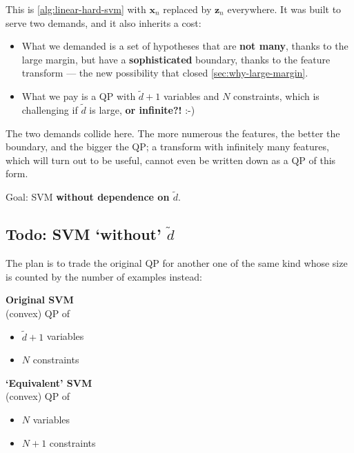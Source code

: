 This is \autoref{alg:linear-hard-svm} with \(\bm{x}_n\) replaced by
\(\bm{z}_n\) everywhere. It was built to serve two demands, and it also
inherits a cost:
\begin{itemize}
    \item What we demanded is a set of hypotheses that are \textbf{not many},
        thanks to the large margin, but have a \textbf{sophisticated}
        boundary, thanks to the feature transform --- the new possibility
        that closed \autoref{sec:why-large-margin}.
    \item What we pay is a QP with \(\tilde{d} + 1\) variables and \(N\)
        constraints, which is challenging if \(\tilde{d}\) is large,
        \textbf{or infinite?!} :-)
\end{itemize}
The two demands collide here. The more numerous the features, the better
the boundary, and the bigger the QP; a transform with infinitely many
features, which will turn out to be useful, cannot even be written down as a
QP of this form.

\begin{moral}
    Goal: SVM \textbf{without dependence on \(\tilde{d}\)}.
\end{moral}

\subsection{Todo: SVM `without' \texorpdfstring{\(\tilde{d}\)}{d~}}

The plan is to trade the original QP for another one of the same kind whose
size is counted by the number of examples instead:

\begin{center}
    \begin{minipage}[t]{0.45\textwidth}
        \textbf{Original SVM}\\
        (convex) QP of
        \begin{itemize}
            \item \(\tilde{d} + 1\) variables
            \item \(N\) constraints
        \end{itemize}
    \end{minipage}%
    \hfill
    \begin{minipage}[t]{0.45\textwidth}
        \textbf{`Equivalent' SVM}\\
        (convex) QP of
        \begin{itemize}
            \item \(N\) variables
            \item \(N + 1\) constraints
        \end{itemize}
    \end{minipage}
\end{center}


